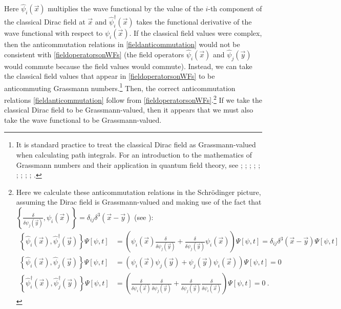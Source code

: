 \documentclass[12pt,secnumarabic,amsmath,amssymb,balancelastpage,nofootinbib]{article}
\begin{document}
Here $\widehat{\psi}_i(\vec{x})$ multiplies the wave functional by the value of the $i$-th component of the classical Dirac field at $\vec{x}$ and $\widehat{\psi}_i^{\dagger}(\vec{x})$ takes the functional derivative of the wave functional with respect to $\psi_i(\vec{x})$.  If the classical field values were complex, then the anticommutation relations in \eqref{fieldanticommutation} would not be consistent with \eqref{fieldoperatorsonWFs} (the field operators $\widehat{\psi}_i(\vec{x})$ and $\widehat{\psi}_j(\vec{y})$ would commute because the field values would commute).  Instead, we can take the classical field values that appear in \eqref{fieldoperatorsonWFs} to be anticommuting Grassmann numbers.\footnote{It is standard practice to treat the classical Dirac field as Grassmann-valued when calculating path integrals.  For an introduction to the mathematics of Grassmann numbers and their application in quantum field theory, see \citet{berezin}; \citet{hatfield}; \citet[ch.\ 4]{valentini1992}; \citet{valentini1996}; \citet[sec.\ 9.5]{peskinschroeder}; \citet[sec.\ 6.7]{ryder}; \citet[sec.\ 12.8]{greiner1996}; \citet[sec.\ 11.5]{zee2010}; \citet[sec.\ 10.3.2]{duncan}; \citet[sec.\ 14.6]{schwartz}.}  Then, the correct anticommutation relations \eqref{fieldanticommutation} follow from \eqref{fieldoperatorsonWFs}.\footnote{Here we calculate these anticommutation relations in the Schr\"{o}dinger picture, assuming the Dirac field is Grassmann-valued and making use of the fact that $\left\{\frac{\delta}{\delta \psi_j(\vec{y})},\psi_i(\vec{x})\right\}=\delta_{ij}\delta^3 (\vec{x}-\vec{y})$ (see \citealp[eq.\ 9.63]{hatfield}):
\begin{align}
\left\{\widehat{\psi}_i(\vec{x}),\widehat{\psi}^{\dagger}_j(\vec{y})\right\}\Psi[\psi,t]&=\left(\psi_i(\vec{x})\frac{\delta}{\delta \psi_j(\vec{y})}+\frac{\delta}{\delta \psi_j(\vec{y})}\psi_i(\vec{x})\right)\Psi[\psi,t]=\delta_{ij}\delta^3 (\vec{x}-\vec{y})\Psi[\psi,t]
\nonumber
\\
\left\{\widehat{\psi}_i(\vec{x}),\widehat{\psi}_j(\vec{y})\right\}\Psi[\psi,t]&=\left(\psi_i(\vec{x})\psi_j(\vec{y})+\psi_j(\vec{y})\psi_i(\vec{x})\right)\Psi[\psi,t]=0
\nonumber
\\
\left\{\widehat{\psi}^{\dagger}_i(\vec{x}),\widehat{\psi}^{\dagger}_j(\vec{y})\right\}\Psi[\psi,t]&=\left(\frac{\delta}{\delta \psi_i(\vec{x})}\frac{\delta}{\delta \psi_j(\vec{y})}+\frac{\delta}{\delta \psi_j(\vec{y})}\frac{\delta}{\delta \psi_i(\vec{x})}\right)\Psi[\psi,t]=0
\label{derivingfieldcommutation}
\ .
\end{align}
}  If we take the classical Dirac field to be Grassmann-valued, then it appears that we must also take the wave functional to be Grassmann-valued.
\end{document}
